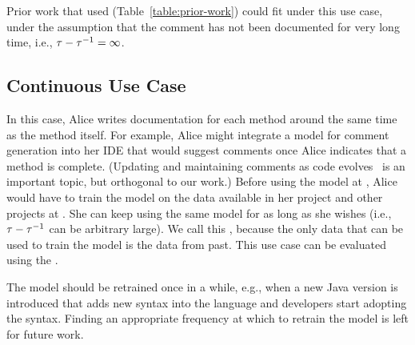 Prior work that used \crossproj (Table~\ref{table:prior-work}) could
fit under this use case, under the assumption that the comment has not
been documented for very long time, i.e., $\tau - \tau^{-1} = \infty$.


\subsection{Continuous Use Case}

In this case, Alice writes documentation for each method around the
same time as the method itself.  For example, Alice might integrate a
model for comment generation into her IDE that would suggest comments
once Alice indicates that a method is complete.  (Updating and
maintaining comments as code
evolves~\cite{PanthaplackelETAL20CommentUpdate} is an important topic,
but orthogonal to our work.)  Before using the model at \atime, Alice
would have to train the model on the data available in her project and
other projects at \atimep.  She can keep using the same model for as
long as she wishes (i.e., $\tau-\tau^{-1}$ can be arbitrary large).
We call this \emph{\cmode}, because the only data that can be used to
train the model is the data from past.  This use case can be evaluated
using the \evoaware \methodology.

The model should be retrained once in a while, e.g., when a new Java
version is introduced that adds new syntax into the language and
developers start adopting the syntax.  Finding an appropriate
frequency at which to retrain the model is left for future work.
